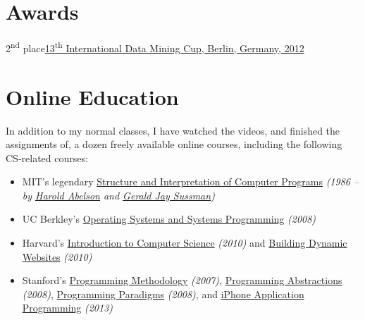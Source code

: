 \documentclass{tccv}
\begin{document}
{{\begin{project_list}
\end{project_list}




\vspace{-20pt}




\section{Awards}

\begin{factlist}
\item{2\textsuperscript{nd} place}{\href{http://www.data-mining-cup.de/en/review/dmc-2012/}{13\textsuperscript{th} International Data Mining Cup, Berlin, Germany, 2012}}
\end{factlist}




\newpage


\section{Online Education}

In addition to my normal classes, I have watched the videos, and finished the assignments of, a dozen freely available online courses, including the following CS-related courses:

\begin{itemize}

\item MIT's legendary \href{http://groups.csail.mit.edu/mac/classes/6.001/abelson-sussman-lectures/}{Structure and Interpretation of Computer Programs} {\it(1986 -- by \href{https://en.wikipedia.org/wiki/Hal_Abelson}{Harold Abelson} and \href{https://en.wikipedia.org/wiki/Gerald_Jay_Sussman}{Gerald Jay Sussman})}

\item UC Berkley's \href{http://www.cs.berkeley.edu/~kubitron/courses/cs162-F08/}{Operating Systems and Systems Programming} {\it(2008)}

\item Harvard's \href{http://cs50.tv/2010/fall/}{Introduction to Computer Science} {\it(2010)} and \href{http://cs75.tv/2010/fall/}{Building Dynamic Websites} {\it(2010)}

\item Stanford's \href{http://see.stanford.edu/see/courseinfo.aspx?coll=824a47e1-135f-4508-a5aa-866adcae1111}{Programming Methodology} {\it(2007)}, \href{http://see.stanford.edu/see/courseinfo.aspx?coll=11f4f422-5670-4b4c-889c-008262e09e4e}{Programming Abstractions} {\it(2008)}, \href{http://see.stanford.edu/see/courseinfo.aspx?coll=2d712634-2bf1-4b55-9a3a-ca9d470755ee}{Programming Paradigms} {\it(2008)}, and \href{http://www.stanford.edu/class/cs193p}{iPhone Application Programming} {\it(2013)}
	

\end{itemize}}}
\end{document}
